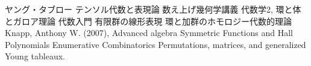 \begin{thebibliography}{99}
   ヤング・タブロー
   テンソル代数と表現論
   数え上げ幾何学講義
   代数学2, 環と体とガロア理論
   代数入門
   有限群の線形表現
   環と加群のホモロジー代数的理論
  Knapp, Anthony W. (2007), Advanced algebra
   Symmetric Functions and Hall Polynomials
   Enumerative Combinatorics
   Permutations, matrices, and generalized Young tableaux.
\end{thebibliography}